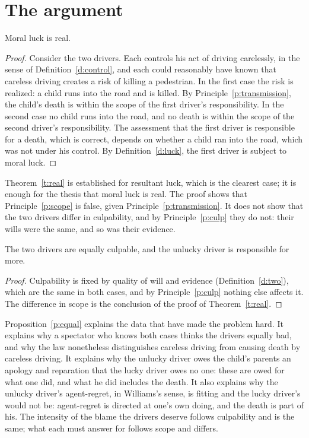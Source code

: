 \documentclass{situationist-preprint}
\begin{document}
\section{The argument}

\begin{theorem}\label{t:real}
Moral luck is real.
\end{theorem}

\begin{proof}
Consider the two drivers. Each controls his act of driving carelessly, in the sense of Definition~\ref{d:control}, and each could reasonably have known that careless driving creates a risk of killing a pedestrian. In the first case the risk is realized: a child runs into the road and is killed. By Principle~\ref{p:transmission}, the child's death is within the scope of the first driver's responsibility. In the second case no child runs into the road, and no death is within the scope of the second driver's responsibility. The assessment that the first driver is responsible for a death, which is correct, depends on whether a child ran into the road, which was not under his control. By Definition~\ref{d:luck}, the first driver is subject to moral luck.
\end{proof}

Theorem~\ref{t:real} is established for resultant luck, which is the clearest case; it is enough for the thesis that moral luck is real. The proof shows that Principle~\ref{p:scope} is false, given Principle~\ref{p:transmission}. It does not show that the two drivers differ in culpability, and by Principle~\ref{p:culp} they do not: their wills were the same, and so was their evidence.

\begin{proposition}\label{p:equal}
The two drivers are equally culpable, and the unlucky driver is responsible for more.
\end{proposition}

\begin{proof}
Culpability is fixed by quality of will and evidence (Definition~\ref{d:two}), which are the same in both cases, and by Principle~\ref{p:culp} nothing else affects it. The difference in scope is the conclusion of the proof of Theorem~\ref{t:real}.
\end{proof}

Proposition~\ref{p:equal} explains the data that have made the problem hard. It explains why a spectator who knows both cases thinks the drivers equally bad, and why the law nonetheless distinguishes careless driving from causing death by careless driving. It explains why the unlucky driver owes the child's parents an apology and reparation that the lucky driver owes no one: these are owed for what one did, and what he did includes the death. It also explains why the unlucky driver's agent-regret, in Williams's sense, is fitting and the lucky driver's would not be: agent-regret is directed at one's own doing, and the death is part of his. The intensity of the blame the drivers deserve follows culpability and is the same; what each must answer for follows scope and differs.
\end{document}
